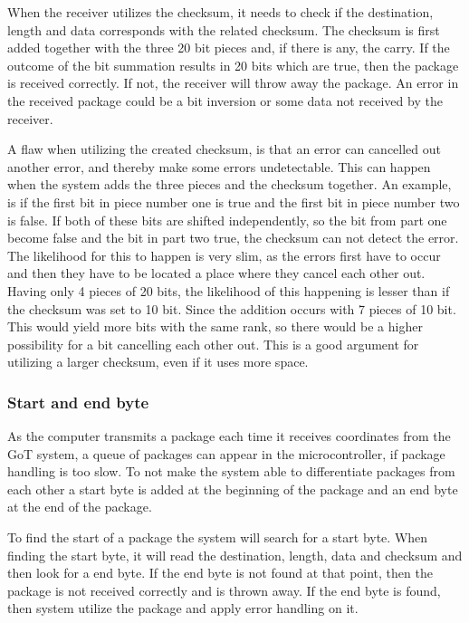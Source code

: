 When the receiver utilizes the checksum, it needs to check if the destination, length and data corresponds with the related checksum. The checksum is first added together with the three 20 bit pieces and, if there is any, the carry. If the outcome of the bit summation results in 20 bits which are true, then the package is received correctly. If not, the receiver will throw away the package. An error in the received package could be a bit inversion or some data not received by the receiver. 

A flaw when utilizing the created checksum, is that an error can cancelled out another error, and thereby make some errors undetectable. This can happen when the system adds the three pieces and the checksum together. An example, is if the first bit in piece number one is true and the first bit in piece number two is false. If both of these bits are shifted independently, so the bit from part one become false and the bit in part two true, the checksum can not detect the error. The likelihood for this to happen is very slim, as the errors first have to occur and then they have to be located a place where they cancel each other out. Having only 4 pieces of 20 bits, the likelihood of this happening is lesser than if the checksum was set to 10 bit. Since the addition occurs with 7 pieces of 10 bit. This would yield more bits with the same rank, so there would be a higher possibility for a bit cancelling each other out. This is a good argument for utilizing a larger checksum, even if it uses more space.

\subsubsection{Start and end byte}
As the computer transmits a package each time it receives coordinates from the GoT system, a queue of packages can appear in the microcontroller, if package handling is too slow. To not make the system able to differentiate packages from each other a start byte is added at the beginning of the package and an end byte at the end of the package. 

To find the start of a package the system will search for a start byte. When finding the start byte, it will read the destination, length, data and checksum and then look for a end byte. If the end byte is not found at that point, then the package is not received correctly and is thrown away. If the end byte is found, then system utilize the package and apply error handling on it. 


